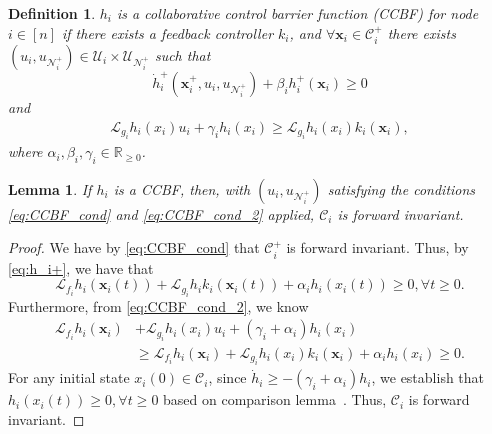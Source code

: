 \documentclass[letterpaper, 10 pt, conference]{ieeeconf}  %
\theoremstyle{plain}
\newtheorem{lemma}{Lemma}
\newtheorem{definition}{Definition}%
\begin{document}
\begin{definition}\cite[Collaborative Control Barrier Functions]{butler2024collaborativesafety}
    $h_i$ is a \textit{collaborative control barrier function} (CCBF) for node~$i \in [n]$ if there exists a feedback controller $k_i$, and $\forall \mathbf{x}_i \in \mathcal{C}_i^+$ there exists $(u_i, u_{\mathcal{N}_i^+}) \in \mathcal{U}_i \times \mathcal{U}_{\mathcal{N}_i^+}$ such that 
    \begin{equation} \label{eq:CCBF_cond}
        \dot{h}_i^+(\mathbf{x}_i^+, u_i, u_{\mathcal{N}_i^+}) + \beta_i h_i^+(\mathbf{x}_i)  \geq 0
    \end{equation}
    and
    \begin{equation}\label{eq:CCBF_cond_2}
        \begin{aligned}
             \mathcal{L}_{g_i}h_i(x_i) u_i +  \gamma_i h_i(x_i) \geq \mathcal{L}_{g_i}h_i(x_i) k_i(\mathbf{x}_i),
        \end{aligned}
    \end{equation}
    where $\alpha_i, \beta_i, \gamma_i \in \mathbb{R}_{\geq 0}$.
\end{definition}

\begin{lemma} \label{lem:CCBF}
    If $h_i$ is a CCBF, then, with  $(u_i, u_{\mathcal{N}_i^+})$  satisfying the conditions \eqref{eq:CCBF_cond} and \eqref{eq:CCBF_cond_2} applied, $\mathcal{C}_i$ is forward invariant. 
\end{lemma}
\begin{proof}
We have by \eqref{eq:CCBF_cond} that $\mathcal{C}_i^+$ is forward invariant. Thus, by \eqref{eq:h_i+}, we have that 
\begin{equation*}
    \mathcal{L}_{f_i}h_i(\mathbf{x}_i(t)) + \mathcal{L}_{g_i}h_ik_i(\mathbf{x}_i(t)) +  \alpha_i h_i(x_i(t)) \geq 0, \forall t\geq 0.
\end{equation*}
Furthermore, from \eqref{eq:CCBF_cond_2},  we know
\begin{equation*}
\begin{aligned}
    \mathcal{L}_{f_i}h_i(\mathbf{x}_i) & + \mathcal{L}_{g_i}h_i(x_i)u_i +  (\gamma_i + \alpha_i) h_i(x_i) \\
    & \geq \mathcal{L}_{f_i}h_i(\mathbf{x}_i) + \mathcal{L}_{g_i}h_i(x_i) k_i(\mathbf{x}_i) + \alpha_i h_i(x_i) \geq 0.
\end{aligned}
\end{equation*}
For any initial state $x_i(0)\in \mathcal{C}_i$, since $\dot{h}_i \geq - (\gamma_i + \alpha_i) h_i$, we establish that $h_i(x_i(t))\geq 0, \forall t\geq 0$ based on comparison lemma~\cite[Lemma~3.4]{Khalil2002}. Thus, $\mathcal{C}_i$ is forward invariant.
\end{proof}
\end{document}
